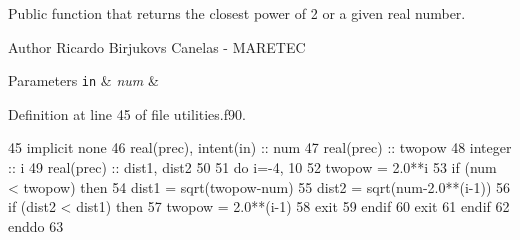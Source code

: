 Public function that returns the closest power of 2 or a given real number. 

\begin{DoxyAuthor}{Author}
Ricardo Birjukovs Canelas -\/ M\+A\+R\+E\+T\+EC
\end{DoxyAuthor}

\begin{DoxyParams}[1]{Parameters}
\mbox{\tt in}  & {\em num} & \\
\hline
\end{DoxyParams}


Definition at line 45 of file utilities.\+f90.


\begin{DoxyCode}
45     \textcolor{keywordtype}{implicit none}
46     \textcolor{keywordtype}{real(prec)}, \textcolor{keywordtype}{intent(in)} :: num
47     \textcolor{keywordtype}{real(prec)} :: twopow
48     \textcolor{keywordtype}{integer} :: i
49     \textcolor{keywordtype}{real(prec)} :: dist1, dist2
50     
51     \textcolor{keywordflow}{do} i=-4, 10
52         twopow = 2.0**i
53         \textcolor{keywordflow}{if} (num < twopow) \textcolor{keywordflow}{then}
54             dist1 = sqrt(twopow-num)
55             dist2 = sqrt(num-2.0**(i-1))
56             \textcolor{keywordflow}{if} (dist2 < dist1) \textcolor{keywordflow}{then}
57                 twopow = 2.0**(i-1)
58                 \textcolor{keywordflow}{exit}
59 \textcolor{keywordflow}{            endif}
60             \textcolor{keywordflow}{exit}
61 \textcolor{keywordflow}{        endif}
62 \textcolor{keywordflow}{    enddo}
63    
\end{DoxyCode}
